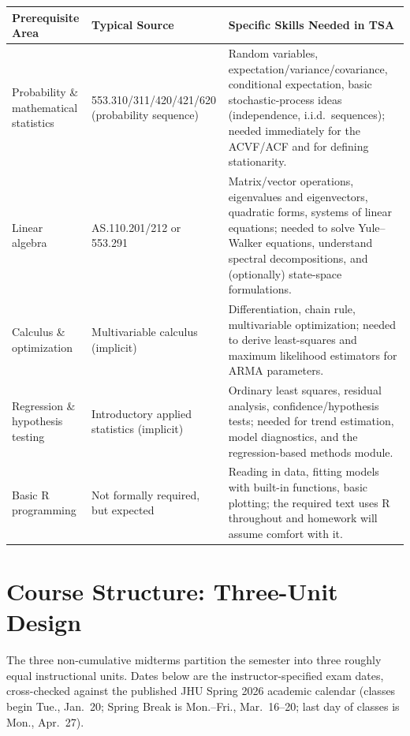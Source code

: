 \documentclass[11pt]{article}
\begin{document}
\renewcommand{\arraystretch}{1.25}
\begin{longtable}{p{3.6cm} p{3.6cm} p{7.1cm}}
\toprule
\textbf{Prerequisite Area} & \textbf{Typical Source} & \textbf{Specific Skills Needed in TSA} \\
\midrule
\endhead
Probability \& mathematical statistics &
  553.310/311/420/421/620 (probability sequence) &
  Random variables, expectation/variance/covariance, conditional expectation, basic stochastic-process
  ideas (independence, i.i.d.\ sequences); needed immediately for the ACVF/ACF and for defining
  stationarity. \\
Linear algebra &
  AS.110.201/212 or 553.291 &
  Matrix/vector operations, eigenvalues and eigenvectors, quadratic forms, systems of linear equations;
  needed to solve Yule--Walker equations, understand spectral decompositions, and (optionally)
  state-space formulations. \\
Calculus \& optimization &
  Multivariable calculus (implicit) &
  Differentiation, chain rule, multivariable optimization; needed to derive least-squares and maximum
  likelihood estimators for ARMA parameters. \\
Regression \& hypothesis testing &
  Introductory applied statistics (implicit) &
  Ordinary least squares, residual analysis, confidence/hypothesis tests; needed for trend estimation,
  model diagnostics, and the regression-based methods module. \\
Basic R programming &
  Not formally required, but expected &
  Reading in data, fitting models with built-in functions, basic plotting; the required text uses R
  throughout and homework will assume comfort with it. \\
\bottomrule
\end{longtable}

\section{Course Structure: Three-Unit Design}

The three non-cumulative midterms partition the semester into three roughly equal instructional
units. Dates below are the instructor-specified exam dates, cross-checked against the published JHU
Spring 2026 academic calendar (classes begin Tue., Jan.\ 20; Spring Break is Mon.--Fri., Mar.\ 16--20;
last day of classes is Mon., Apr.\ 27).
\end{document}
